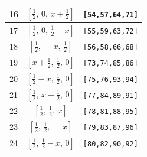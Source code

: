 \documentclass[fleqn,8pt]{jsarticle}
\begin{document}
\begin{longtable}{ccc}
16 & $\left[ \frac{1}{2},\, 0,\, x + \frac{1}{2} \right]$ & {\tt [54,57,64,71]} \\ \hline
17 & $\left[ \frac{1}{2},\, 0,\, \frac{1}{2} - x \right]$ & {\tt [55,59,63,72]} \\ \hline
18 & $\left[ \frac{1}{2},\, - x,\, \frac{1}{2} \right]$ & {\tt [56,58,66,68]} \\ \hline
19 & $\left[ x + \frac{1}{2},\, \frac{1}{2},\, 0 \right]$ & {\tt [73,74,85,86]} \\ \hline
20 & $\left[ \frac{1}{2} - x,\, \frac{1}{2},\, 0 \right]$ & {\tt [75,76,93,94]} \\ \hline
21 & $\left[ \frac{1}{2},\, x + \frac{1}{2},\, 0 \right]$ & {\tt [77,84,89,91]} \\ \hline
22 & $\left[ \frac{1}{2},\, \frac{1}{2},\, x \right]$ & {\tt [78,81,88,95]} \\ \hline
23 & $\left[ \frac{1}{2},\, \frac{1}{2},\, - x \right]$ & {\tt [79,83,87,96]} \\ \hline
24 & $\left[ \frac{1}{2},\, \frac{1}{2} - x,\, 0 \right]$ & {\tt [80,82,90,92]} \\
\end{longtable}
\renewcommand{\arraystretch}{1.2}
\end{document}
